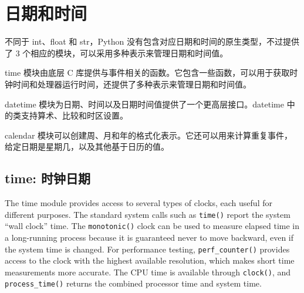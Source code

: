 \chapter{日期和时间}
不同于 int、float 和 str，Python 没有包含对应日期和时间的原生类型，不过提供了 3 个相应的模块，可以采用多种表示来管理日期和时间值。

time 模块由底层 C 库提供与事件相关的函数。它包含一些函数，可以用于获取时钟时间和处理器运行时间，还提供了多种表示来管理日期和时间值。

datetime 模块为日期、时间以及日期时间值提供了一个更高层接口。datetime 中的类支持算术、比较和时区设置。

calendar 模块可以创建周、月和年的格式化表示。它还可以用来计算重复事件，给定日期是星期几，以及其他基于日历的值。
\section{time: 时钟日期}
The time module provides access to several types of clocks, each useful for different purposes. The standard system calls such as \verb|time()| report the system “wall clock” time. The \verb|monotonic()| clock can be used to measure elapsed time in a long-running process because it is guaranteed never to move backward, even if the system time is changed. For performance testing, \verb|perf_counter()| provides access to the clock with the highest available resolution, which makes short time measurements more accurate. The CPU time is available through \verb|clock()|, and \verb|process_time()| returns the combined processor time and system time.

